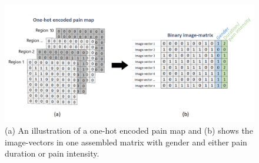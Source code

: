 \begin{figure} [H]
\centering
\includegraphics[width=1\textwidth]{figures/onehotmatrix}
\caption{(a) An illustration of a one-hot encoded pain map and (b) shows the image-vectors in one assembled matrix with gender and either pain duration or pain intensity.}
\label{fig:onehot}
\end{figure}
